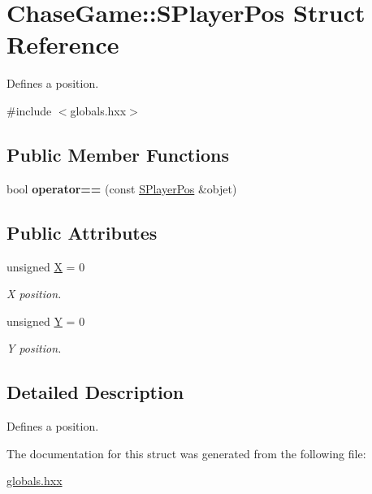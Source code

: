 \hypertarget{struct_chase_game_1_1_s_player_pos}{\section{Chase\-Game\-:\-:S\-Player\-Pos Struct Reference}
\label{struct_chase_game_1_1_s_player_pos}
}


Defines a position.  




{\ttfamily \#include $<$globals.\-hxx$>$}

\subsection*{Public Member Functions}
\begin{DoxyCompactItemize}
\item 
\hypertarget{struct_chase_game_1_1_s_player_pos_a16d84d116194f402b751f7265dd4fb91}{bool {\bfseries operator==} (const \hyperlink{struct_chase_game_1_1_s_player_pos}{S\-Player\-Pos} \&objet)}\label{struct_chase_game_1_1_s_player_pos_a16d84d116194f402b751f7265dd4fb91}

\end{DoxyCompactItemize}
\subsection*{Public Attributes}
\begin{DoxyCompactItemize}
\item 
\hypertarget{struct_chase_game_1_1_s_player_pos_a28b353619ad10ef89da6308319b6ee39}{unsigned \hyperlink{struct_chase_game_1_1_s_player_pos_a28b353619ad10ef89da6308319b6ee39}{X} = 0}\label{struct_chase_game_1_1_s_player_pos_a28b353619ad10ef89da6308319b6ee39}

\begin{DoxyCompactList}\small\item\em X position. \end{DoxyCompactList}\item 
\hypertarget{struct_chase_game_1_1_s_player_pos_a0e20d9da2b1da89994a83e8acd72814c}{unsigned \hyperlink{struct_chase_game_1_1_s_player_pos_a0e20d9da2b1da89994a83e8acd72814c}{Y} = 0}\label{struct_chase_game_1_1_s_player_pos_a0e20d9da2b1da89994a83e8acd72814c}

\begin{DoxyCompactList}\small\item\em Y position. \end{DoxyCompactList}\end{DoxyCompactItemize}


\subsection{Detailed Description}
Defines a position. 

The documentation for this struct was generated from the following file\-:\begin{DoxyCompactItemize}
\item 
\hyperlink{globals_8hxx}{globals.\-hxx}\end{DoxyCompactItemize}
